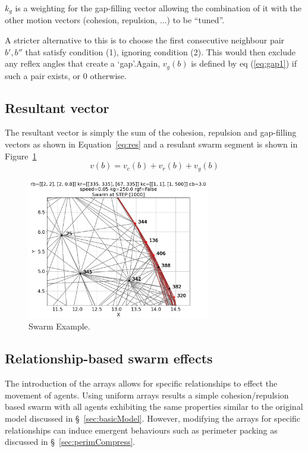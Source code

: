 \documentclass[12pt,a4paper]{IEEEtran}
\newcommand{\kg}{\mathit{k_g}}
\begin{document}
$\kg$ is a weighting for the gap-filling vector allowing the combination of it
with the other motion vectors (cohesion, repulsion, ...) to be ``tuned''.

A stricter alternative to this is to choose the first consecutive neighbour
pair $b',b''$ that satisfy condition (1), ignoring condition (2).  This would then exclude any reflex angles that create a `gap'.Again, $v_g(b)$ is defined by eq (\ref{eq:gap1}) if such a pair exists, or 0 otherwise.

\subsection{Resultant vector}
The resultant vector is simply the sum of the cohesion, repulsion and
gap-filling vectors as shown in Equation~\ref{eq:res} and a resulant swarm segment is shown in Figure~\ref{fig:swarmExample}
\begin{equation}\label{eq:res}
	v(b) = v_c(b) + v_r(b) + v_g(b) 
\end{equation}

\begin{figure}[H]
	\begin{center}
		\includegraphics[width=8cm]{figures/perimeterCompress}
	\end{center}
	\caption{Swarm Example.\label{fig:swarmExample}}
\end{figure}

\subsection{Relationship-based swarm effects}

The introduction of the arrays allows for specific relationships to effect the movement of agents. Using uniform arrays results a simple cohesion/repulsion based swarm with all agents exhibiting the same properties similar to the original model discussed in \S~\ref{sec:basicModel}. However, modifying the arrays for specific relationships can induce emergent behaviours such as perimeter packing as discussed in \S~\ref{sec:perimCompress}.
\end{document}
